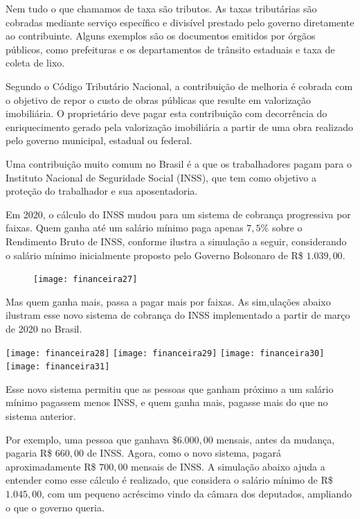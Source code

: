 Nem tudo o que chamamos de taxa são tributos. As taxas tributárias são cobradas mediante serviço específico e divisível prestado pelo governo diretamente ao contribuinte. Alguns exemplos são os documentos emitidos por órgãos públicos, como prefeituras e os departamentos de trânsito estaduais e taxa de coleta de lixo.

Segundo o Código Tributário Nacional, a contribuição de melhoria é cobrada com o objetivo de repor o custo de obras públicas que resulte em valorização imobiliária. O proprietário deve pagar esta contribuição com decorrência do enriquecimento gerado pela valorização imobiliária a partir de uma obra realizado pelo governo municipal, estadual ou federal.

Uma contribuição muito comum no Brasil é a que os trabalhadores pagam para o Instituto Nacional de Seguridade Social (INSS), que tem como objetivo a proteção do trabalhador e sua aposentadoria.

Em 2020, o cálculo do INSS mudou para um sistema de cobrança progressiva por faixas. Quem ganha até um salário mínimo paga apenas $7{,}5$\% sobre o Rendimento Bruto de INSS, conforme ilustra a simulação a seguir, considerando o salário mínimo inicialmente proposto pelo Governo Bolsonaro de R\$ $1.039{,}00$.

\begin{figure}[H]
\centering

\texttt{[image: financeira27]}
\end{figure}

Mas quem ganha mais, passa a pagar mais por faixas. As sim,ulações abaixo ilustram esse novo sistema de cobrança do INSS implementado a partir de março de 2020 no Brasil.

\begin{multicols}{2}
\setlength{\columnsep}{-10pt}
\texttt{[image: financeira28]}
\texttt{[image: financeira29]}
\texttt{[image: financeira30]}
\texttt{[image: financeira31]}
\end{multicols}


Esse novo sistema permitiu que as pessoas que ganham próximo a um salário mínimo pagassem menos INSS, e quem ganha mais, pagasse mais do que no sistema anterior.

Por exemplo, uma pessoa que ganhava \$$6.000{,}00$ mensais, antes da mudança, pagaria R\$ $660{,}00$ de INSS. Agora, como o novo sistema, pagará aproximadamente R\$ $700{,}00$ mensais de INSS. A simulação abaixo ajuda a entender como esse cálculo é realizado, que considera o salário mínimo de R\$ $1.045{,}00$, com um pequeno acréscimo vindo da câmara dos deputados, ampliando o que o governo queria.

